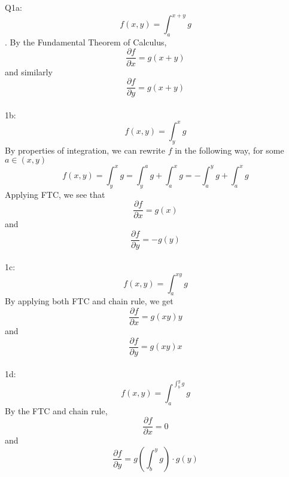 \documentclass[letterpaper]{article}
\begin{document}
Q1a:
\\ $$f(x,y) = \int_a^{x+y} g$$. By the Fundamental Theorem of Calculus, $$\frac{\partial f}{\partial x} = g(x+y)$$ and similarly $$\frac{\partial f}{\partial y} = g(x+y)$$
\\ 1b: \\ $$f(x,y) = \int_y^x g$$ By properties of integration, we can rewrite $f$ in the following way, for some $a\in (x,y)$ 
$$f(x,y) = \int_y^x g = \int_y^a g + \int_a^x g = - \int_a^y g + \int_a^x g$$
Applying FTC, we see that $$\frac{\partial f}{\partial x} = g(x)$$ and $$\frac{\partial f}{\partial y} = -g(y)$$
\\ 1c: \\
$$f(x,y) = \int_a^{xy} g$$ By applying both FTC and chain rule, we get $$\frac{\partial f}{\partial x} = g(xy)y$$ and $$\frac{\partial f}{\partial y} = g(xy)x$$
\\ 1d: \\
$$f(x,y) = \int_a^{\int_b^y g} g$$ By the FTC and chain rule, $$\frac{\partial f}{\partial x} =0$$ and $$\frac{\partial f}{\partial y} = g(\int_b^y g) \cdot g(y)$$
\end{document}
